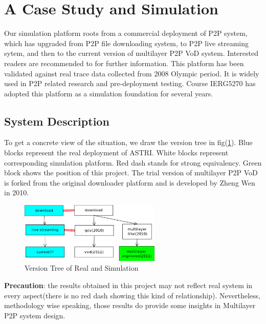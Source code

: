 \documentclass[11pt,a4paper]{article}
\begin{document}
\section{A Case Study and Simulation }
\label{sec:case}

Our simulation platform roots from a commercial deployment
of P2P system\cite{astri}, which has upgraded from P2P file downloading 
system, to P2P live streaming sytem, and then to the current 
version of multilayer P2P VoD system. Interested
readers are recommended to \cite{huang2010simulation} for 
further information. This platform has been validated against 
real trace data collected from 2008 Olympic period. It is 
widely used in P2P related research and pre-deployment testing. 
Course IERG5270\cite{ierg5270} has adopted this platform 
as a simulation foundation for several years. 

\subsection{System Description}

To get a concrete view of the situation, we draw the 
version tree in fig(\ref{fig:simu_version_tree}). 
Blue blocks represent the real deployment of ASTRI. 
White blocks represent corresponding simulation platform.
Red dash stands for strong equivalency. 
Green block shows the position of this project. 
The trial version of multilayer P2P VoD is forked from the 
original downloader platform and is developed by 
Zheng Wen in 2010. 

\begin{figure}[htb]
	\centering
	\includegraphics[width=0.6\textwidth]{../fig/version_tree.png}
	\caption{Version Tree of Real and Simulation}
	\label{fig:simu_version_tree}
\end{figure}

\textbf{Precaution}: the results obtained in this project may not 
reflect real system in every aspect(there is no red dash showing 
this kind of relationship). Nevertheless, methodology wise speaking, 
those results do provide some insights in Multilayer P2P system design.  
\end{document}
